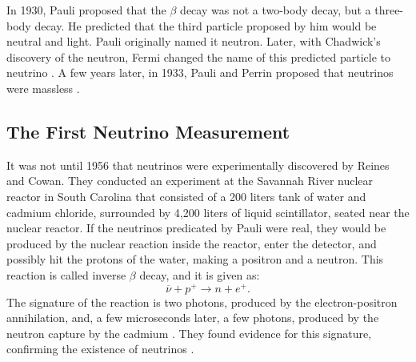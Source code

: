 In 1930, Pauli proposed that the $\beta$ decay was not a two-body decay, but a three-body decay. He predicted that the third particle proposed by him would be neutral and light. Pauli originally named it neutron. Later, with Chadwick's discovery of the neutron, Fermi changed the name of this predicted particle to neutrino \cite{griffiths}. A few years later, in 1933, Pauli and Perrin proposed that neutrinos were massless \cite{griffiths}.

\subsection{The First Neutrino Measurement}
It was not until 1956 that neutrinos were experimentally discovered by Reines and Cowan. They conducted an experiment at the Savannah River nuclear reactor in South Carolina that consisted of a 200 liters tank of water and cadmium chloride, surrounded by 4,200 liters of liquid scintillator, seated near the nuclear reactor. If the neutrinos predicated by Pauli were real, they would be produced by the nuclear reaction inside the reactor, enter the detector, and possibly hit the protons of the water, making a positron and a neutron. This reaction is called inverse $\beta$ decay, and it is given as:
%
\begin{equation}
	\overline{\nu} + p^+ \longrightarrow n + e^+.
	\label{inverse_beta_decay_eq}
\end{equation}
%
The signature of the reaction is two photons, produced by the electron-positron annihilation, and, a few microseconds later, a few photons, produced by the neutron capture by the cadmium \cite{nobel_leptons}. They found evidence for this signature, confirming the existence of neutrinos \cite{cowan_reines}. 


